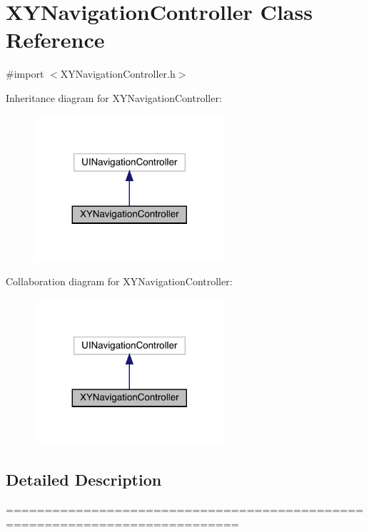 \hypertarget{interface_x_y_navigation_controller}{}\section{X\+Y\+Navigation\+Controller Class Reference}
\label{interface_x_y_navigation_controller}


{\ttfamily \#import $<$X\+Y\+Navigation\+Controller.\+h$>$}



Inheritance diagram for X\+Y\+Navigation\+Controller\+:\nopagebreak
\begin{figure}[H]
\begin{center}
\leavevmode
\includegraphics[width=200pt]{interface_x_y_navigation_controller__inherit__graph}
\end{center}
\end{figure}


Collaboration diagram for X\+Y\+Navigation\+Controller\+:\nopagebreak
\begin{figure}[H]
\begin{center}
\leavevmode
\includegraphics[width=200pt]{interface_x_y_navigation_controller__coll__graph}
\end{center}
\end{figure}


\subsection{Detailed Description}
============================================================================

